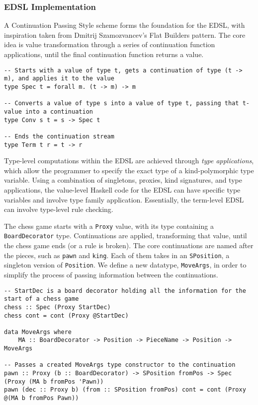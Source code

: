\documentclass[12pt, a4paper]{scrartcl}
\begin{document}
\subsubsection{EDSL Implementation}

A Continuation Passing Style\cite{cps} scheme forms the foundation for the EDSL, with inspiration taken from Dmitrij Szamozvancev's Flat Builders pattern\cite{mezzo}. The core idea is value transformation through a series of continuation function applications, until the final continuation function returns a value.

\begin{lstlisting}
-- Starts with a value of type t, gets a continuation of type (t -> m), and applies it to the value
type Spec t = forall m. (t -> m) -> m

-- Converts a value of type s into a value of type t, passing that t-value into a continuation
type Conv s t = s -> Spec t

-- Ends the continuation stream
type Term t r = t -> r
\end{lstlisting}

Type-level computations within the EDSL are achieved through \emph{type applications}\cite{typeapplication}, which allow the programmer to specify the exact type of a kind-polymorphic type variable. Using a combination of singletons, proxies, kind signatures, and type applications, the value-level Haskell code for the EDSL can have specific type variables and involve type family application. Essentially, the term-level EDSL can involve type-level rule checking.

The chess game starts with a \lstinline{Proxy} value, with its type containing a \lstinline{BoardDecorator} type. Continuations are applied, transforming that value, until the chess game ends (or a rule is broken). The core continuations are named after the pieces, such as \lstinline{pawn} and \lstinline{king}. Each of them takes in an \lstinline{SPosition}, a singleton version of \lstinline{Position}. We define a new datatype, \lstinline{MoveArgs}, in order to simplify the process of passing information between the continuations.

\begin{lstlisting}
-- StartDec is a board decorator holding all the information for the start of a chess game
chess :: Spec (Proxy StartDec)
chess cont = cont (Proxy @StartDec)

data MoveArgs where
    MA :: BoardDecorator -> Position -> PieceName -> Position -> MoveArgs

-- Passes a created MoveArgs type constructor to the continuation
pawn :: Proxy (b :: BoardDecorator) -> SPosition fromPos -> Spec (Proxy (MA b fromPos 'Pawn))
pawn (dec :: Proxy b) (from :: SPosition fromPos) cont = cont (Proxy @(MA b fromPos Pawn))
\end{lstlisting}
\end{document}
